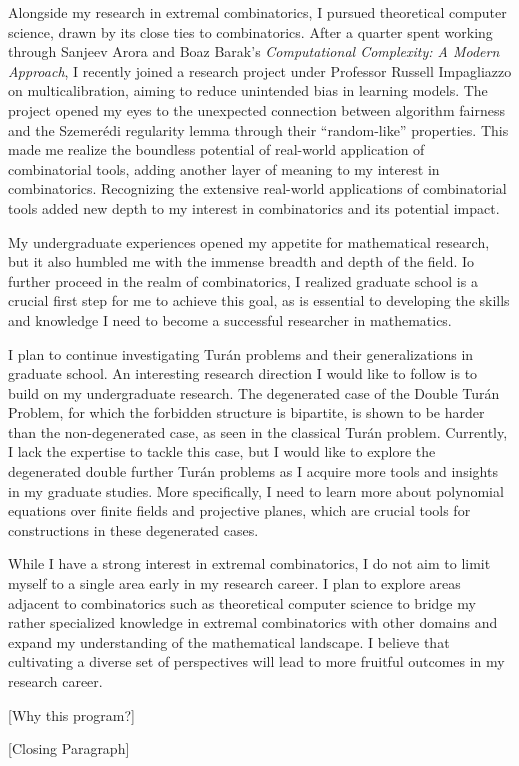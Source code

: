 \documentclass[12pt]{article}
\begin{document}
Alongside my research in extremal combinatorics, I pursued theoretical computer science, drawn by
its close ties to combinatorics. After a quarter spent working through Sanjeev Arora and Boaz
Barak's \textit{Computational Complexity: A Modern Approach}, I recently joined a research project
under Professor Russell Impagliazzo on multicalibration, aiming to reduce unintended bias in
learning models. The project opened my eyes to the unexpected connection between algorithm fairness
and the Szemerédi regularity lemma through their ``random-like'' properties. This made me realize
the boundless potential of real-world application of combinatorial tools, adding another layer of
meaning to my interest in combinatorics. Recognizing the extensive real-world applications of
combinatorial tools added new depth to my interest in combinatorics and its potential impact. 

My undergraduate experiences opened my appetite for mathematical research, but it also humbled me
with the immense breadth and depth of the field. Io further proceed in the realm of combinatorics, I
realized graduate school is a crucial first step for me to achieve this goal, as is essential to
developing the skills and knowledge I need to become a successful researcher in mathematics.

I plan to continue investigating Turán problems and their generalizations in graduate school. An
interesting research direction I would like to follow is to build on my undergraduate research. The
degenerated case of the Double Turán Problem, for which the forbidden structure is bipartite, is
shown to be harder than the non-degenerated case, as seen in the classical Turán problem. Currently,
I lack the expertise to tackle this case, but I would like to explore the degenerated double further
Turán problems as I acquire more tools and insights in my graduate studies. More specifically, I
need to learn more about polynomial equations over finite fields and projective planes, which are
crucial tools for constructions in these degenerated cases.

While I have a strong interest in extremal combinatorics, I do not aim to limit myself to a
single area early in my research career. I plan to explore areas adjacent to combinatorics such as
theoretical computer science to bridge my rather specialized knowledge in extremal
combinatorics with other domains and expand my understanding of the mathematical landscape. I
believe that cultivating a diverse set of perspectives will lead to more fruitful outcomes in my
research career.

[Why this program?]

[Closing Paragraph]
\end{document}
